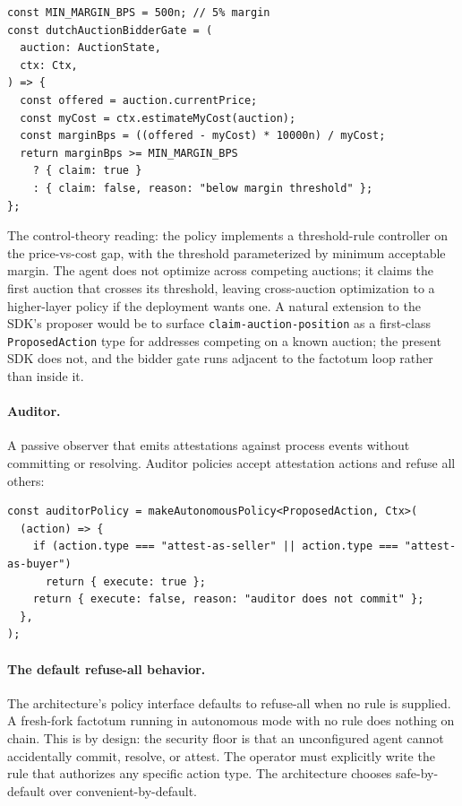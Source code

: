\documentclass[11pt,a4paper]{article}
\theoremstyle{definition}
\theoremstyle{remark}
\begin{document}
\begin{lstlisting}
const MIN_MARGIN_BPS = 500n; // 5% margin
const dutchAuctionBidderGate = (
  auction: AuctionState,
  ctx: Ctx,
) => {
  const offered = auction.currentPrice;
  const myCost = ctx.estimateMyCost(auction);
  const marginBps = ((offered - myCost) * 10000n) / myCost;
  return marginBps >= MIN_MARGIN_BPS
    ? { claim: true }
    : { claim: false, reason: "below margin threshold" };
};
\end{lstlisting}

The control-theory reading: the policy implements a threshold-rule
controller on the price-vs-cost gap, with the threshold
parameterized by minimum acceptable margin. The agent does not
optimize across competing auctions; it claims the first auction
that crosses its threshold, leaving cross-auction optimization to
a higher-layer policy if the deployment wants one. A natural
extension to the SDK's proposer would be to surface
\texttt{claim-auction-position} as a first-class
\texttt{ProposedAction} type for addresses competing on a known
auction; the present SDK does not, and the bidder gate runs
adjacent to the factotum loop rather than inside it.

\paragraph{Auditor.}
A passive observer that emits attestations against process events
without committing or resolving. Auditor policies accept attestation
actions and refuse all others:

\begin{lstlisting}
const auditorPolicy = makeAutonomousPolicy<ProposedAction, Ctx>(
  (action) => {
    if (action.type === "attest-as-seller" || action.type === "attest-as-buyer")
      return { execute: true };
    return { execute: false, reason: "auditor does not commit" };
  },
);
\end{lstlisting}

\paragraph{The default refuse-all behavior.}
The architecture's policy interface defaults to refuse-all when no
rule is supplied. A fresh-fork factotum running in autonomous mode
with no rule does nothing on chain. This is by design: the
security floor is that an unconfigured agent cannot accidentally
commit, resolve, or attest. The operator must explicitly write
the rule that authorizes any specific action type. The
architecture chooses safe-by-default over
convenient-by-default.
\end{document}
